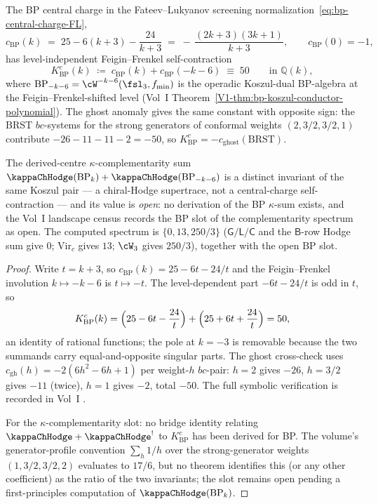\begin{proposition}
\label{prop:bp-kappa-conductor}
\ClaimStatusProvedElsewhere
The BP central charge in the Fateev--Lukyanov screening
normalization~\eqref{eq:bp-central-charge-FL},
\[
c_{\mathrm{BP}}(k)
\;=\; 25 - 6(k+3) - \frac{24}{k+3}
\;=\; -\,\frac{(2k+3)(3k+1)}{k+3},
\qquad c_{\mathrm{BP}}(0) = -1,
\]
has level-independent Feigin--Frenkel self-contraction
\begin{equation}\label{eq:bp-kappa-conductor}
 K^{c}_{\mathrm{BP}}(k)
 \;\coloneqq\; c_{\mathrm{BP}}(k) + c_{\mathrm{BP}}(-k-6)
 \;\equiv\; 50
 \qquad \text{in } \mathbb{Q}(k),
\end{equation}
where $\mathrm{BP}_{-k-6} = \cW^{-k-6}(\fsl_3, f_{\min})$ is the
operadic Koszul-dual BP-algebra at the Feigin--Frenkel-shifted
level (Vol~I
Theorem~\ref{V1-thm:bp-koszul-conductor-polynomial}). The ghost
anomaly gives the same constant with opposite sign: the BRST
$bc$-systems for the strong generators of conformal weights
$(2, 3/2, 3/2, 1)$ contribute $-26 - 11 - 11 - 2 = -50$, so
$K^{c}_{\mathrm{BP}} = -c_{\mathrm{ghost}}(\mathrm{BRST})$.

The derived-centre $\kappa$-complementarity sum
$\kappaChHodge(\mathrm{BP}_k) + \kappaChHodge(\mathrm{BP}_{-k-6})$
is a distinct invariant of the same Koszul pair — a chiral-Hodge
supertrace, not a central-charge self-contraction — and its value
is \emph{open}: no derivation of the BP $\kappa$-sum exists, and the
Vol~I landscape census records the BP slot of the complementarity
spectrum as open. The computed spectrum is
$\{0, 13, 250/3\}$ ($\mathsf{G}/\mathsf{L}/\mathsf{C}$ and the
$\mathsf{B}$-row Hodge sum give $0$; $\mathrm{Vir}_c$ gives $13$;
$\cW_3$ gives $250/3$), together with the open BP slot.
\end{proposition}

\begin{proof}
Write $t = k+3$, so $c_{\mathrm{BP}}(k) = 25 - 6t - 24/t$ and the
Feigin--Frenkel involution $k \mapsto -k-6$ is $t \mapsto -t$. The
level-dependent part $-6t - 24/t$ is odd in $t$, so
\[
 K^{c}_{\mathrm{BP}}(k)
 = \Bigl(25 - 6t - \frac{24}{t}\Bigr)
 + \Bigl(25 + 6t + \frac{24}{t}\Bigr)
 = 50,
\]
an identity of rational functions; the pole at $k=-3$ is removable
because the two summands carry equal-and-opposite singular parts.
The ghost cross-check uses $c_{\mathrm{gh}}(h) = -2(6h^2-6h+1)$ per
weight-$h$ $bc$-pair: $h = 2$ gives $-26$, $h = 3/2$ gives $-11$
(twice), $h = 1$ gives $-2$, total $-50$. The full symbolic
verification is recorded in Vol~I
.

For the $\kappa$-complementarity slot: no bridge identity relating
$\kappaChHodge + {\kappaChHodge}^!$ to $K^{c}_{\mathrm{BP}}$ has been
derived for BP. The volume's generator-profile convention
$\sum_h 1/h$ over the strong-generator weights $(1, 3/2, 3/2, 2)$
evaluates to $17/6$, but no theorem identifies this (or any other
coefficient) as the ratio of the two invariants; the slot remains
open pending a first-principles computation of
$\kappaChHodge(\mathrm{BP}_k)$.
\end{proof}

